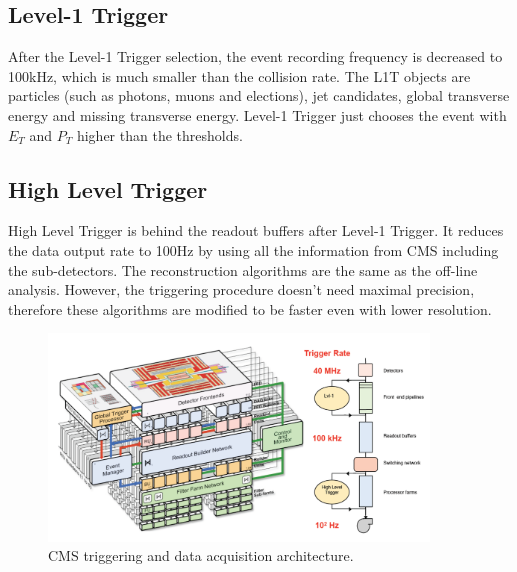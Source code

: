 \subsection*{Level-1 Trigger}
After the Level-1 Trigger selection, the event recording frequency is decreased to 100kHz\cite{L1T}, which is much smaller than the collision rate. The L1T objects are particles (such as photons, muons and elections), jet candidates, global transverse energy and missing transverse energy. Level-1 Trigger just chooses the event with $E_{T}$ and $P_{T}$ higher than the thresholds.

\subsection*{High Level Trigger}
High Level Trigger is behind the readout buffers after Level-1 Trigger. It reduces the data output rate to 100Hz by using all the information from CMS including the sub-detectors. The reconstruction algorithms are the same as the off-line analysis. However, the triggering procedure doesn't need maximal precision, therefore these algorithms are modified to be faster even with lower resolution.\\

\begin{figure}[hbtp]
  \begin{center}
    \includegraphics[width=0.9\textwidth]{figure/CH2/trigger.png}
  \end{center}
  \caption{\label{fig:trigger}CMS triggering and data acquisition architecture.}
\end{figure}
